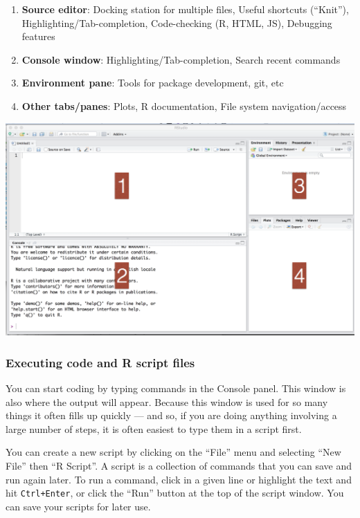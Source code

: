 \documentclass[
]{book}
\providecommand{\tightlist}{%
  \setlength{\itemsep}{0pt}\setlength{\parskip}{0pt}}
\begin{document}
\begin{enumerate}
\def\labelenumi{(\arabic{enumi})}
\tightlist
\item
  \textbf{Source editor}: Docking station for multiple files, Useful shortcuts (``Knit''), Highlighting/Tab-completion, Code-checking (R, HTML, JS), Debugging features
\item
  \textbf{Console window}: Highlighting/Tab-completion, Search recent commands
\item
  \textbf{Environment pane}: Tools for package development, git, etc
\item
  \textbf{Other tabs/panes}: Plots, R documentation, File system navigation/access
\end{enumerate}

\includegraphics{img/rstudio-panes.png}

\hypertarget{executing-code-and-r-script-files}{%
\subsubsection*{Executing code and R script files}\label{executing-code-and-r-script-files}}

You can start coding by typing commands in the Console panel. This window is also where the output will appear. Because this window is used for so many things it often fills up quickly --- and so, if you are doing anything involving a large number of steps, it is often easiest to type them in a script first.

You can create a new script by clicking on the ``File'' menu and selecting ``New File'' then ``R Script''. A script is a collection of commands that you can save and run again later. To run a command, click in a given line or highlight the text and hit \texttt{Ctrl+Enter}, or click the ``Run'' button at the top of the script window. You can save your scripts for later use.
\end{document}
